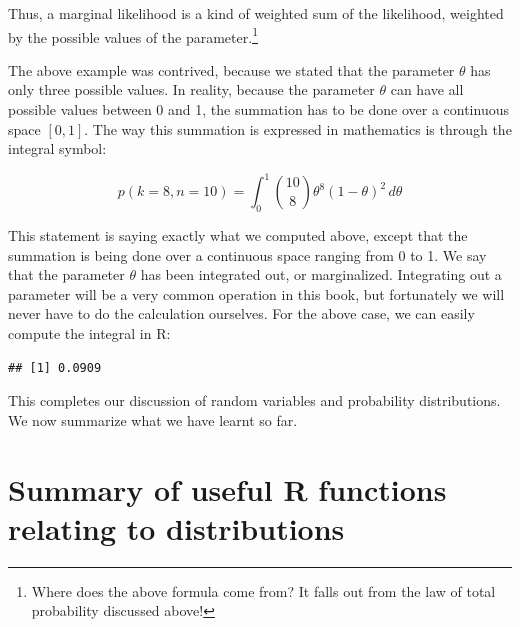 \documentclass[12pt,]{krantz}
\newenvironment{Shaded}{\begin{snugshade}}{\end{snugshade}}
\newcommand{\KeywordTok}[1]{\textcolor[rgb]{0.13,0.29,0.53}{\textbf{#1}}}
\newcommand{\DataTypeTok}[1]{\textcolor[rgb]{0.13,0.29,0.53}{#1}}
\newcommand{\DecValTok}[1]{\textcolor[rgb]{0.00,0.00,0.81}{#1}}
\newcommand{\StringTok}[1]{\textcolor[rgb]{0.31,0.60,0.02}{#1}}
\newcommand{\ControlFlowTok}[1]{\textcolor[rgb]{0.13,0.29,0.53}{\textbf{#1}}}
\newcommand{\OperatorTok}[1]{\textcolor[rgb]{0.81,0.36,0.00}{\textbf{#1}}}
\newcommand{\NormalTok}[1]{#1}
\theoremstyle{definition}
\theoremstyle{definition}
\theoremstyle{definition}
\theoremstyle{remark}
\begin{document}
Thus, a marginal likelihood is a kind of weighted sum of the likelihood,
weighted by the possible values of the parameter.\footnote{Where does
  the above formula come from? It falls out from the law of total
  probability discussed above!}

The above example was contrived, because we stated that the parameter
\(\theta\) has only three possible values. In reality, because the
parameter \(\theta\) can have all possible values between 0 and 1, the
summation has to be done over a continuous space \([0,1]\). The way this
summation is expressed in mathematics is through the integral symbol:

\begin{equation}
p(k=8,n=10) = \int_0^1 \binom{10}{8} \theta^8 (1-\theta)^{2}\, d\theta
\end{equation}

This statement is saying exactly what we computed above, except that the
summation is being done over a continuous space ranging from 0 to 1. We
say that the parameter \(\theta\) has been integrated out, or
marginalized. Integrating out a parameter will be a very common
operation in this book, but fortunately we will never have to do the
calculation ourselves. For the above case, we can easily compute the
integral in R:

\begin{Shaded}
\end{Shaded}

\begin{verbatim}
## [1] 0.0909
\end{verbatim}

This completes our discussion of random variables and probability
distributions. We now summarize what we have learnt so far.

\section{Summary of useful R functions relating to
distributions}\label{summary-of-useful-r-functions-relating-to-distributions}
\end{document}
